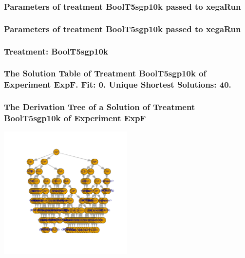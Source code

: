 \documentclass[18pt,c]{beamer}
\begin{document}

 \begin{frame}
 \fontsize{8pt}{9pt}\selectfont
 \frametitle{  Parameters of treatment BoolT5sgp10k passed to xegaRun
 }

 \label{ExpFtParmTable034.tex}  
 \end{frame}


 \begin{frame}
 \fontsize{8pt}{9pt}\selectfont
 \frametitle{  Parameters of treatment BoolT5sgp10k passed to xegaRun
 }

 \label{ExpFtParmTable035.tex}  
 \end{frame}

 \begin{frame}
 \fontsize{8pt}{9pt}\selectfont
 \frametitle{ Treatment: BoolT5sgp10k }

 \label{ExpFStatsTable014.tex}  
 \end{frame}

 \begin{frame}
 \fontsize{8pt}{9pt}\selectfont
 \frametitle{ The Solution Table of Treatment BoolT5sgp10k of Experiment ExpF. Fit: 0. Unique Shortest Solutions: 40. }

 \label{ExpFSolutionTable008.tex}  
 \end{frame}

 \begin{frame}
 \frametitle{ The Derivation Tree of a Solution of Treatment BoolT5sgp10k of Experiment ExpF }
 \begin{center}
\includegraphics[width=0.5\textwidth, angle=0]
{ExpFDerivationTreeFigure008.pdf}
 \end{center}
 \label{report/ExpFDerivationTreeFigure008.pdf}  
 \end{frame}
\end{document}
